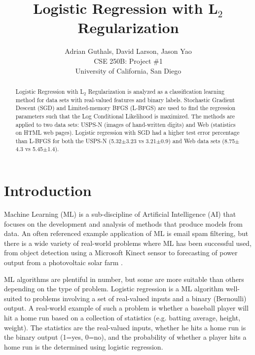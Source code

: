 \documentclass[10pt]{article}
\title{Logistic Regression with L$_2$ Regularization}
\author{Adrian Guthals, David Larson, Jason Yao \\
CSE 250B: Project \#1 \\
University of California, San Diego \\
}
\begin{document}
\maketitle


\begin{abstract}
Logistic Regression with L$_2$ Regularization is analyzed as a classification learning method for data sets with real-valued features and binary labels. Stochastic Gradient Descent (SGD) and Limited-memory BFGS (L-BFGS) are used to find the regression parameters such that the Log Conditional Likelihood is maximized. The methods are applied to two data sets: USPS-N (images of hand-written digits) and Web (statistics on HTML web pages). Logistic regression with SGD had a higher test error percentage than L-BFGS for both the USPS-N (5.32$\pm$3.23 vs 3.21$\pm$0.9) and Web data sets (8.75$\pm$4.3 vs 5.45$\pm$1.4).
\end{abstract}



\section{Introduction}
\label{sec:intro}

Machine Learning (ML) is a sub-discipline of Artificial Intelligence (AI) that focuses on the development and analysis of methods that produce models from data. An often referenced example application of ML is email spam filtering, but there is a wide variety of real-world problems where ML has been successful used, from object detection using a Microsoft Kinect sensor \cite{Kinect} to forecasting of power output from a photovoltaic solar farm \cite{solar}.

ML algorithms are plentiful in number, but some are more suitable than others depending on the type of problem. Logistic regression is a ML algorithm well-suited to problems involving a set of real-valued inputs and a binary (Bernoulli) output. A real-world example of such a problem is whether a baseball player will hit a home run based on a collection of statistics (e.g. batting average, height, weight). The statistics are the real-valued inputs, whether he hits a home run is the binary output (1=yes, 0=no), and the probability of whether a player hits a home run is the determined using logistic regression. 
\end{document}
